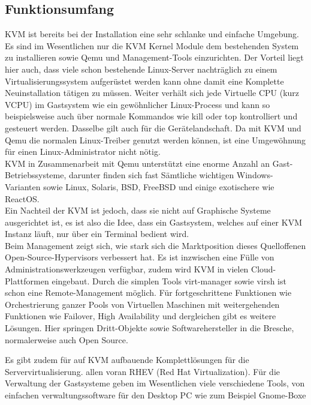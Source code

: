 \documentclass[14pt]{extreport}
\begin{document}
\subsection{Funktionsumfang}
KVM ist bereits bei der Installation eine sehr schlanke und einfache Umgebung. 
Es sind im Wesentlichen nur die KVM Kernel Module dem bestehenden System zu installieren sowie Qemu und Management-Tools einzurichten. Der Vorteil liegt hier auch, dass viele schon bestehende Linux-Server nachträglich zu einem Virtualisierungssystem aufgerüstet werden kann ohne damit eine Komplette Neuinstallation tätigen zu müssen.
Weiter verhält sich jede  Virtuelle CPU (kurz VCPU) im Gastsystem wie ein gewöhnlicher Linux-Process und kann so beispielsweise auch über normale Kommandos wie kill oder top kontrolliert und gesteuert werden. Dasselbe gilt auch für die Gerätelandschaft. Da mit KVM und Qemu die normalen Linux-Treiber genutzt werden können, ist eine Umgewöhnung für einen Linux-Administrator nicht nötig.\\

KVM in Zusammenarbeit mit Qemu unterstützt eine enorme Anzahl an Gast-Betriebssysteme, darunter finden sich fast Sämtliche wichtigen Windows-Varianten sowie Linux, Solaris, BSD, FreeBSD und einige exotischere wie ReactOS.\\

Ein Nachteil der KVM ist jedoch, dass sie nicht auf Graphische Systeme ausgerichtet ist, es ist also die Idee, dass ein Gastsystem, welches auf einer KVM Instanz läuft, nur über ein Terminal bedient wird.\\
Beim Management zeigt sich, wie stark sich die Marktposition dieses Quelloffenen Open-Source-Hypervisors verbessert hat. Es ist inzwischen eine Fülle von Administrationswerkzeugen verfügbar, zudem wird KVM in vielen Cloud-Plattformen eingebaut.
Durch die simplen Tools virt-manager sowie virsh ist schon eine Remote-Management möglich. Für fortgeschrittene Funktionen wie Orchestrierung ganzer Pools von Virtuellen Maschinen mit weitergehenden Funktionen wie Failover, High Availability und dergleichen gibt es weitere Lösungen. Hier springen Dritt-Objekte sowie Softwarehersteller in die Bresche, normalerweise auch Open Source. 

Es gibt zudem für auf KVM aufbauende Komplettlösungen für die Servervirtualisierung. allen voran RHEV (Red Hat Virtualization).
Für die Verwaltung der Gastsysteme geben im Wesentlichen viele verschiedene Tools, von einfachen verwaltungssoftware für den Desktop PC wie zum Beispiel Gnome-Boxe
\end{document}

